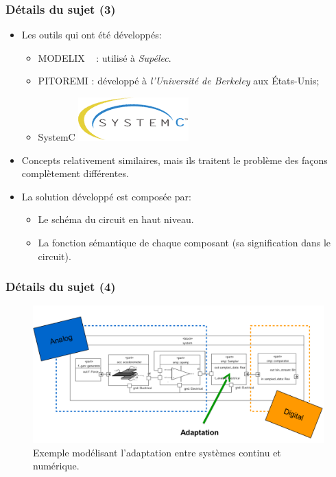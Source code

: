 \documentclass[10pt]{beamer}
\begin{document}
\begin{frame}
\frametitle{Détails du sujet (3)}

\begin{itemize}

\item Les outils qui ont été développés:
\begin{itemize}
\vspace{5pt}
  \item \og MODELIX \fg~ : utilisé à \textit{Supélec}.
  \item \og PITOREMI \fg : développé à \textit{l'Université de Berkeley} aux
  États-Unis;
  \item \og SystemC \fg  \hspace{12pt}
  \includegraphics[scale=0.3]{images/logo_systemc}
 
 \end{itemize}
\vspace{5pt}

\item Concepts relativement similaires, mais ils traitent le problème des façons
complètement différentes.

\vspace{5pt}

\item La solution développé est composée par:

\begin{itemize}
\vspace{5pt}
  \item Le schéma du circuit en haut niveau.
  \item La fonction sémantique de chaque composant (sa  signification dans le
  circuit).
 
 \end{itemize}
\end{itemize}
\end{frame}

\begin{frame}
\frametitle{Détails du sujet (4)}

\begin{figure}[h]
\centering
\includegraphics[scale=0.32]{images/exemple2}
\caption{Exemple modélisant l'adaptation entre systèmes continu et numérique.}
\label{fig:ex2}
\end{figure}

\end{frame}
\end{document}
